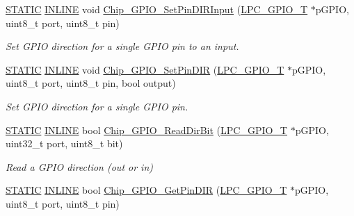 \begin{DoxyCompactItemize}
\hyperlink{group___l_p_c___types___public___macros_ga10b2d890d871e1489bb02b7e70d9bdfb}{S\+T\+A\+T\+IC} \hyperlink{spifi__18xx__43xx_8h_a2eb6f9e0395b47b8d5e3eeae4fe0c116}{I\+N\+L\+I\+NE} void \hyperlink{group___g_p_i_o__18_x_x__43_x_x_ga0c20af0c6b9cee61714643bef6614485}{Chip\+\_\+\+G\+P\+I\+O\+\_\+\+Set\+Pin\+D\+I\+R\+Input} (\hyperlink{struct_l_p_c___g_p_i_o___t}{L\+P\+C\+\_\+\+G\+P\+I\+O\+\_\+T} $\ast$p\+G\+P\+IO, uint8\+\_\+t port, uint8\+\_\+t pin)
\begin{DoxyCompactList}\small\item\em Set G\+P\+IO direction for a single G\+P\+IO pin to an input. \end{DoxyCompactList}\item 
\hyperlink{group___l_p_c___types___public___macros_ga10b2d890d871e1489bb02b7e70d9bdfb}{S\+T\+A\+T\+IC} \hyperlink{spifi__18xx__43xx_8h_a2eb6f9e0395b47b8d5e3eeae4fe0c116}{I\+N\+L\+I\+NE} void \hyperlink{group___g_p_i_o__18_x_x__43_x_x_gac384ba462a45291528e95945c3273772}{Chip\+\_\+\+G\+P\+I\+O\+\_\+\+Set\+Pin\+D\+IR} (\hyperlink{struct_l_p_c___g_p_i_o___t}{L\+P\+C\+\_\+\+G\+P\+I\+O\+\_\+T} $\ast$p\+G\+P\+IO, uint8\+\_\+t port, uint8\+\_\+t pin, bool output)
\begin{DoxyCompactList}\small\item\em Set G\+P\+IO direction for a single G\+P\+IO pin. \end{DoxyCompactList}\item 
\hyperlink{group___l_p_c___types___public___macros_ga10b2d890d871e1489bb02b7e70d9bdfb}{S\+T\+A\+T\+IC} \hyperlink{spifi__18xx__43xx_8h_a2eb6f9e0395b47b8d5e3eeae4fe0c116}{I\+N\+L\+I\+NE} bool \hyperlink{group___g_p_i_o__18_x_x__43_x_x_ga8f436d49d7737db583aa4e71bc21937b}{Chip\+\_\+\+G\+P\+I\+O\+\_\+\+Read\+Dir\+Bit} (\hyperlink{struct_l_p_c___g_p_i_o___t}{L\+P\+C\+\_\+\+G\+P\+I\+O\+\_\+T} $\ast$p\+G\+P\+IO, uint32\+\_\+t port, uint8\+\_\+t bit)
\begin{DoxyCompactList}\small\item\em Read a G\+P\+IO direction (out or in) \end{DoxyCompactList}\item 
\hyperlink{group___l_p_c___types___public___macros_ga10b2d890d871e1489bb02b7e70d9bdfb}{S\+T\+A\+T\+IC} \hyperlink{spifi__18xx__43xx_8h_a2eb6f9e0395b47b8d5e3eeae4fe0c116}{I\+N\+L\+I\+NE} bool \hyperlink{group___g_p_i_o__18_x_x__43_x_x_ga5f36fe1a2c2b2eb958133c27cb65bee5}{Chip\+\_\+\+G\+P\+I\+O\+\_\+\+Get\+Pin\+D\+IR} (\hyperlink{struct_l_p_c___g_p_i_o___t}{L\+P\+C\+\_\+\+G\+P\+I\+O\+\_\+T} $\ast$p\+G\+P\+IO, uint8\+\_\+t port, uint8\+\_\+t pin)

\end{DoxyCompactItemize}
